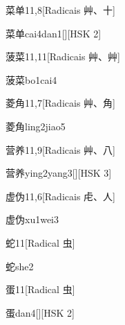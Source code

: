 \begin{entry}{菜单}{11,8}[Radicais ⾋、⼗]
  \begin{phonetics}{菜单}{cai4dan1}[][HSK 2]
  \end{phonetics}
\end{entry}

\begin{entry}{菠菜}{11,11}[Radicais ⾋、⾋]
  \begin{phonetics}{菠菜}{bo1cai4}
  \end{phonetics}
\end{entry}

\begin{entry}{菱角}{11,7}[Radicais ⾋、⾓]
  \begin{phonetics}{菱角}{ling2jiao5}
  \end{phonetics}
\end{entry}

\begin{entry}{营养}{11,9}[Radicais ⾋、⼋]
  \begin{phonetics}{营养}{ying2yang3}[][HSK 3]
  \end{phonetics}
\end{entry}

\begin{entry}{虚伪}{11,6}[Radicais ⾌、⼈]
  \begin{phonetics}{虚伪}{xu1wei3}
  \end{phonetics}
\end{entry}

\begin{entry}{蛇}{11}[Radical ⾍]
  \begin{phonetics}{蛇}{she2}
  \end{phonetics}
\end{entry}

\begin{entry}{蛋}{11}[Radical ⾍]
  \begin{phonetics}{蛋}{dan4}[][HSK 2]
  \end{phonetics}
\end{entry}

